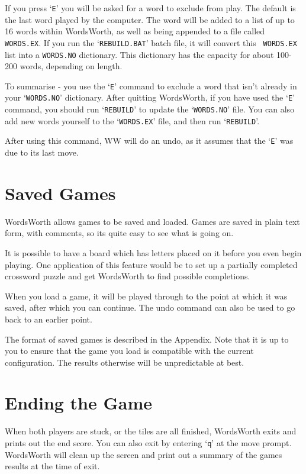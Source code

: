 If you press `{\tt E}' you will be asked for a word to exclude
from play. The default is the last word played by the computer.
The word will be added to a list of up to 16 words within WordsWorth,
as well as being appended to a file called {\tt WORDS.EX}. If you
run the `{\tt REBUILD.BAT}' batch file, it will convert this {\tt
WORDS.EX}
list into a {\tt WORDS.NO} dictionary. This dictionary has the capacity
for about 100-200 words, depending on length.

To summarise - you use the `{\tt E}' command to exclude a word that isn't
already in your `{\tt WORDS.NO}' dictionary. After quitting WordsWorth,
if you have used the `{\tt E}' command, you should run `{\tt REBUILD}' to 
update the `{\tt WORDS.NO}' file. You can also add new words yourself
to the `{\tt WORDS.EX}' file, and then run `{\tt REBUILD}'.

After using this command, WW will do an undo, as it assumes that
the `{\tt E}' was due to its last move.

\section{Saved Games}
\label{savedgame}

WordsWorth allows games to be saved and loaded. Games are saved
in plain text form, with comments, so its quite easy to see what is
going on.

It is possible to have a board which has letters placed on it before
you even begin playing. One application of this feature would
be to set up a partially completed crossword puzzle and get WordsWorth
to find possible completions.

When you load a game, it will be played through to the point at
which it was saved, after which you can continue. The undo command
can also be used to go back to an earlier point.

The format of saved games is described in the Appendix.	Note that 
it is up to you to ensure that the game you load is compatible with
the current configuration. The results otherwise will be unpredictable
at best.

\section{Ending the Game}

When both players are stuck, or the tiles are all finished, WordsWorth
exits and prints out the end score. You can also exit by 
entering `{\tt q}' at the move prompt. WordsWorth will clean up the
screen and print out a summary of the games results at the time
of exit.

